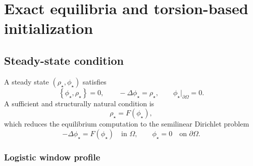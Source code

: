 \documentclass[11pt,a4paper]{article}
\newcommand{\Om}{\Omega}
\newcommand{\bracket}[2]{\left\{#1,#2\right\}}
\begin{document}
\section{Exact equilibria and torsion-based initialization}

\subsection{Steady-state condition}

A steady state $(\rho_\star,\phi_\star)$ satisfies
\begin{equation}
  \bracket{\phi_\star}{\rho_\star}=0,
  \qquad
  -\Delta\phi_\star=\rho_\star,
  \qquad
  \phi_\star|_{\partial\Om}=0.
  \label{eq:steady-general}
\end{equation}
A sufficient and structurally natural condition is
\begin{equation}
  \rho_\star=F(\phi_\star),
  \label{eq:rho-F-phi}
\end{equation}
which reduces the equilibrium computation to the semilinear Dirichlet problem
\begin{equation}
  -\Delta\phi_\star=F(\phi_\star)
  \quad\text{in }\Om,
  \qquad
  \phi_\star=0
  \quad\text{on }\partial\Om.
  \label{eq:semilinear}
\end{equation}
\subsubsection{Logistic window profile}
\end{document}
